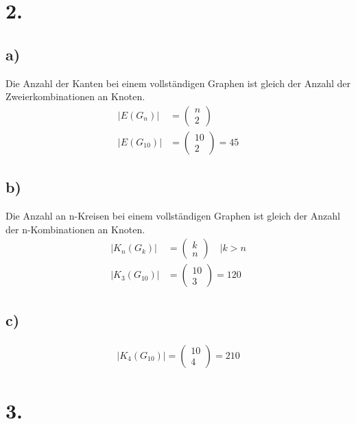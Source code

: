 \documentclass[a4paper]{scrartcl}
\begin{document}
	
\section{2.}
	\subsection{a)}
		Die Anzahl der Kanten bei einem vollständigen Graphen ist gleich der Anzahl der 
		Zweierkombinationen an Knoten.
		\begin{align}
			|E(G_n)| &=  \begin{pmatrix}
				n \\ 2
				\end{pmatrix} \\
			|E(G_{10})| &= \begin{pmatrix}
				10 \\ 2
				\end{pmatrix} 
			= 45 %
		\end{align}
		
	\subsection{b)}
		Die Anzahl an n-Kreisen bei einem vollständigen Graphen ist gleich der Anzahl der
		n-Kombinationen an Knoten.
		\begin{align}
			|K_n(G_k)|&= \begin{pmatrix}
				k \\ n
			\end{pmatrix} \quad | k > n \\
			 |K_3(G_{10})| &= \begin{pmatrix}
			 	10 \\ 3
			 \end{pmatrix} = 120
		\end{align}			
	
	\subsection{c)}
		\begin{align}
			|K_{4}(G_{10})|=\begin{pmatrix}
				10 \\ 4
			\end{pmatrix} = 210
		\end{align}
		

\section{3.}
\end{document}
